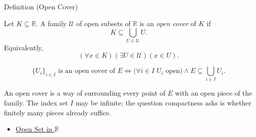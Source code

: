\begin{definitionbox}{Definition (Open Cover)}
\begin{definition}
\label{def:real-open-cover}
Let $K\subseteq\mathbb{R}$.  A family $\mathcal{U}$ of open subsets of
$\mathbb{R}$ is an \emph{open cover} of $K$ if
\[
  K\subseteq\bigcup_{U\in\mathcal{U}}U.
\]
Equivalently,
\[
  (\forall x\in K)(\exists U\in\mathcal{U})(x\in U).
\]
\end{definition}
\end{definitionbox}
\begin{remark*}
\[
\{U_i\}_{i\in I} \text{ is an open cover of } E \Longleftrightarrow \bigl(\forall i\in I\;U_i \text{ open}\bigr)\land E\subseteq\textstyle\bigcup_{i\in I}U_i.
\]
\end{remark*}
\begin{remark*}[Interpretation]
An open cover is a way of surrounding every point of $E$ with an open piece of the family. The index set $I$ may be infinite; the question compactness asks is whether finitely many pieces already suffice.
\end{remark*}
\begin{dependencies}
\begin{itemize}
  \item \hyperref[def:open-set]{Open Set in $\mathbb{R}$}
\end{itemize}
\end{dependencies}
